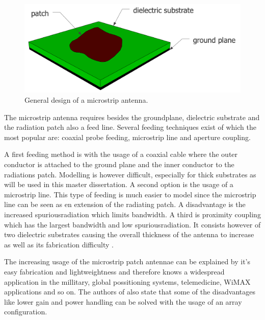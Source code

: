 \begin{figure}[H]
\centering
  \includegraphics[width=\textwidth/2]{../images/patchantenna.png}
  \caption{General design of a microstrip antenna.}
  \label{fig:basicpatchantenna}
\end{figure}

The microstrip antenna requires besides the groundplane, dielectric substrate and the radiation patch also a feed line. Several feeding techniques exist of which the most popular are: coaxial probe feeding, microstrip line and aperture coupling. %

A first feeding method is with the usage of a coaxial cable where the outer conductor is attached to the ground plane and the inner conductor to the radiations patch. Modelling is however difficult, especially for thick substrates as will be used in this master dissertation.
A second option is the usage of a microstrip line. This type of feeding is much easier to model since the microstrip line can be seen as en extension of the radiating patch.
A disadvantage is the increased \gls{spuriousradiation} which limits bandwidth.
A third is proximity coupling which has the largest bandwidth and low \gls{spuriousradiation}. It consists however of two dielectric substrates causing the overall thickness
of the antenna to increase as well as its fabrication difficulty \cite{J13_singh2011micro}.

The increasing usage of the microstrip patch antennae can be explained by it's easy fabrication and lightweightness and therefore knows a widespread application in the millitary, global possitioning systems, telemedicine, WiMAX applications and so on.
The authors of \cite{J13_microstripadvantages} also state that some of the disadvantages like lower gain and power handling can be solved with the usage of an array configuration.

